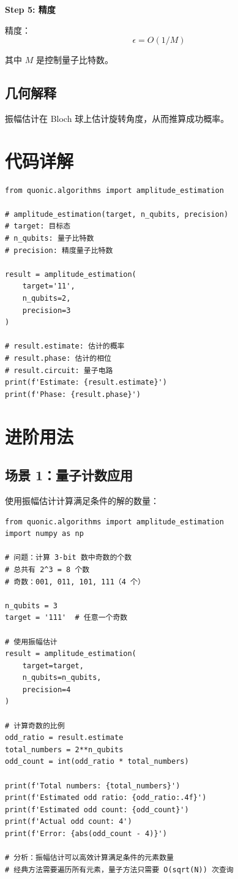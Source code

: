 \documentclass[12pt,a4paper]{article}
\begin{document}
\textbf{Step 5: 精度}

精度：
\begin{equation}
\epsilon = O(1/M)
\end{equation}

其中 $M$ 是控制量子比特数。

\subsection{几何解释}

振幅估计在 Bloch 球上估计旋转角度，从而推算成功概率。

\section{代码详解}

\begin{verbatim}
from quonic.algorithms import amplitude_estimation

# amplitude_estimation(target, n_qubits, precision)
# target: 目标态
# n_qubits: 量子比特数
# precision: 精度量子比特数

result = amplitude_estimation(
    target='11',
    n_qubits=2,
    precision=3
)

# result.estimate: 估计的概率
# result.phase: 估计的相位
# result.circuit: 量子电路
print(f'Estimate: {result.estimate}')
print(f'Phase: {result.phase}')
\end{verbatim}

\section{进阶用法}

\subsection{场景 1：量子计数应用}

使用振幅估计计算满足条件的解的数量：

\begin{verbatim}
from quonic.algorithms import amplitude_estimation
import numpy as np

# 问题：计算 3-bit 数中奇数的个数
# 总共有 2^3 = 8 个数
# 奇数：001, 011, 101, 111（4 个）

n_qubits = 3
target = '111'  # 任意一个奇数

# 使用振幅估计
result = amplitude_estimation(
    target=target,
    n_qubits=n_qubits,
    precision=4
)

# 计算奇数的比例
odd_ratio = result.estimate
total_numbers = 2**n_qubits
odd_count = int(odd_ratio * total_numbers)

print(f'Total numbers: {total_numbers}')
print(f'Estimated odd ratio: {odd_ratio:.4f}')
print(f'Estimated odd count: {odd_count}')
print(f'Actual odd count: 4')
print(f'Error: {abs(odd_count - 4)}')

# 分析：振幅估计可以高效计算满足条件的元素数量
# 经典方法需要遍历所有元素，量子方法只需要 O(sqrt(N)) 次查询
\end{verbatim}
\end{document}

